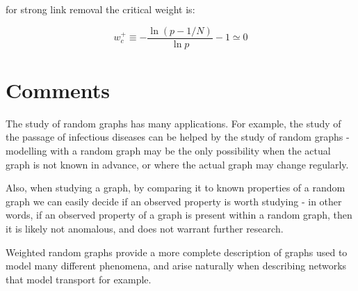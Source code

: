 \documentclass{report}
\begin{document}
for strong link removal the critical weight is: \bigskip

\[
	w_{c}^{+} \equiv - \frac{\ln{(p - 1/N)}}{\ln{p}} - 1 \simeq 0
\]\medskip











\chapter{Comments}

The study of random graphs has many applications. For example, the study of the passage of infectious 
diseases can be helped by the study of random graphs - modelling with a random graph may be the only 
possibility when the actual graph is not known in advance, or where the actual graph may change 
regularly. \bigskip

Also, when studying a graph, by comparing it to known properties of a random graph we can easily decide 
if an observed property is worth studying - in other words, if an observed property of a graph is present 
within a random graph, then it is likely not anomalous, and does not warrant further research. \bigskip

Weighted random graphs provide a more complete description of graphs used to model many different 
phenomena, and arise naturally when describing networks that model transport for example. \bigskip


\newpage










\end{document}
